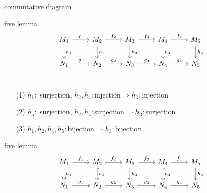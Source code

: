 \documentclass[unicode]{beamer}
\begin{document}
	\begin{frame}[fragile]{commutative diagram}
		\begin{block}{five lemma}
			\[ 
				\begin{tikzcd}
					M_1 \arrow[r,"f_1"]\arrow[d,"h_1"] & M_2 \arrow[r,"f_2"]\arrow[d,"h_2"] & M_3 \arrow[r,"f_3"]\arrow[d,"h_3"] & M_4\arrow[r,"f_4"]\arrow[d,"h_4"] & M_5 \arrow[d,"h_5"]\\
					N_1 \arrow[r,"g_1"] & N_2 \arrow[r,"g_2"] & N_3 \arrow[r,"g_3"] & N_4\arrow[r,"g_4"] & N_5 \\
				\end{tikzcd}
		\]
		\vspace{-35pt}
		\begin{enumerate}
			\item[(1)]
				$h_1\colon$ surjection, $h_2,h_4\colon$injection$\Longrightarrow h_3\colon $injection
			\item[(2)]
				$h_5\colon$ surjection, $h_2,h_4\colon$surjection$\Longrightarrow h_3\colon $surjection
			\item[(3)]
				 $h_1,h_2,h_4,h_5\colon$bijection$\Longrightarrow h_3\colon $bijection
		\end{enumerate}
		\end{block}
	\end{frame}
	\begin{frame}[fragile]{five lemma}
			\[ 
				\begin{tikzcd}
					M_1 \arrow[r,"f_1"]\arrow[d,two heads,"h_1"] & M_2 \arrow[r,"f_2"]\arrow[d,hook,"h_2"] & M_3 \arrow[r,"f_3"]\arrow[d,"h_3"] & M_4\arrow[r,"f_4"]\arrow[d,hook,"h_4"] & M_5 \arrow[d,"h_5"]\\
					N_1 \arrow[r,"g_1"] & N_2 \arrow[r,"g_2"] & N_3 \arrow[r,"g_3"] & N_4\arrow[r,"g_4"] & N_5 \\
				\end{tikzcd}
		\]
	\end{frame}
\end{document}
